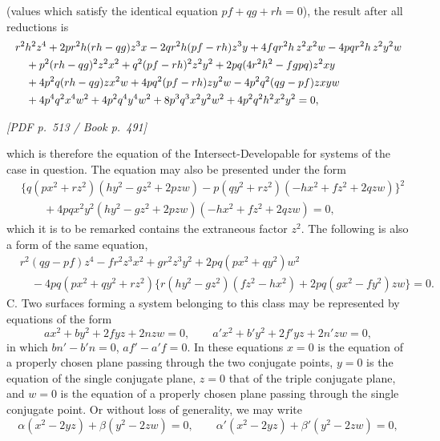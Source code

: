 \documentclass[11pt]{article}
\newcommand{\Page}[2]{\bigskip\noindent\textit{[PDF p.~#1 / Book p.~#2]}\par\smallskip}
\begin{document}
(values which satisfy the identical equation $pf+qg+rh=0$), the result after all
reductions is
\[
\resizebox{\textwidth}{!}{$\displaystyle
\begin{aligned}
&r^2h^2z^4+2pr^2h(rh-qg)z^3x-2qr^2h(pf-rh)z^3y
 +4fqr^2h\,z^2x^2w-4pqr^2h\,z^2y^2w\\
&\quad+p^2(rh-qg)^2z^2x^2+q^2(pf-rh)^2z^2y^2
 +2pq(4r^2h^2-fgpq)z^2xy\\
&\quad+4p^2q(rh-qg)zx^2w+4pq^2(pf-rh)zy^2w
-4p^2q^2(qg-pf)zxyw\\
&\quad+4p^4q^2x^4w^2+4p^2q^4y^4w^2+8p^3q^3x^2y^2w^2
 +4p^2q^2h^2x^2y^2=0,
\end{aligned}$}
\]

\Page{513}{491}

\noindent which is therefore the equation of the Intersect-Developable for systems of the case
in question. The equation may also be presented under the form
\[
\begin{aligned}
&\{q(px^2+rz^2)(hy^2-gz^2+2pzw)
-p(qy^2+rz^2)(-hx^2+fz^2+2qzw)\}^2\\
&\qquad +4pqx^2y^2(hy^2-gz^2+2pzw)(-hx^2+fz^2+2qzw)=0,
\end{aligned}
\]
which it is to be remarked contains the extraneous factor $z^2$. The following is
also a form of the same equation,
\[
\begin{aligned}
&r^2(qg-pf)z^4-fr^2z^3x^2+gr^2z^3y^2
   +2pq(px^2+qy^2)w^2\\
&\quad -4pq(px^2+qy^2+rz^2)
\{r(hy^2-gz^2)(fz^2-hx^2)+2pq(gx^2-fy^2)zw\}=0.
\end{aligned}
\]
C. Two surfaces forming a system belonging to this class may be represented by
equations of the form
\[
        ax^2+by^2+2fyz+2nzw=0,\qquad
        a'x^2+b'y^2+2f'yz+2n'zw=0,
\]
in which $bn'-b'n=0$, $af'-a'f=0$. In these equations $x=0$ is the equation of a
properly chosen plane passing through the two conjugate points, $y=0$ is the equation
of the single conjugate plane, $z=0$ that of the triple conjugate plane, and $w=0$
is the equation of a properly chosen plane passing through the single conjugate point.
Or without loss of generality, we may write
\[
        \alpha(x^2-2yz)+\beta(y^2-2zw)=0,\qquad
        \alpha'(x^2-2yz)+\beta'(y^2-2zw)=0,
\]
\end{document}
